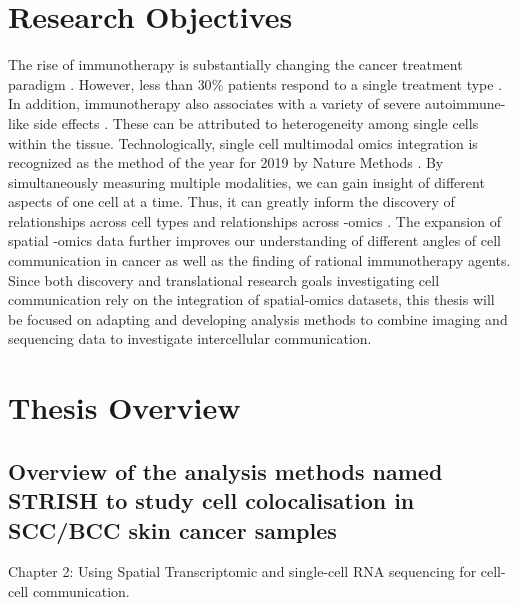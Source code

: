 \section{Research Objectives}
The rise of immunotherapy is substantially changing the cancer treatment paradigm \cite{dobosz2019intriguing}. However, less than $30\%$ patients respond to a single treatment type \cite{ott2017combination}. In addition, immunotherapy also associates with a variety of severe autoimmune-like side effects \cite{naidoo2015toxicities,bertrand2015immune}. These can be attributed to heterogeneity among single cells within the tissue. Technologically, single cell multimodal omics integration is recognized as the method of the year for 2019 by Nature Methods \cite{teichmann2020method}. By simultaneously measuring multiple modalities, we can gain insight of different aspects of one cell at a time. Thus, it can greatly inform the discovery of relationships across cell types and relationships across -omics \cite{teichmann2020method}. The expansion of spatial -omics data further improves our understanding of different angles of cell communication in cancer as well as the finding of rational immunotherapy agents. Since both discovery and translational research goals investigating cell communication rely on the integration of spatial-omics datasets, this thesis will be focused on adapting and developing analysis methods to combine imaging and sequencing data to investigate intercellular communication.   


\section{Thesis Overview}
\subsection{Overview of the analysis methods named STRISH to study cell colocalisation in SCC/BCC skin cancer samples}

Chapter 2: Using Spatial Transcriptomic and single-cell RNA sequencing for cell-cell communication. 

